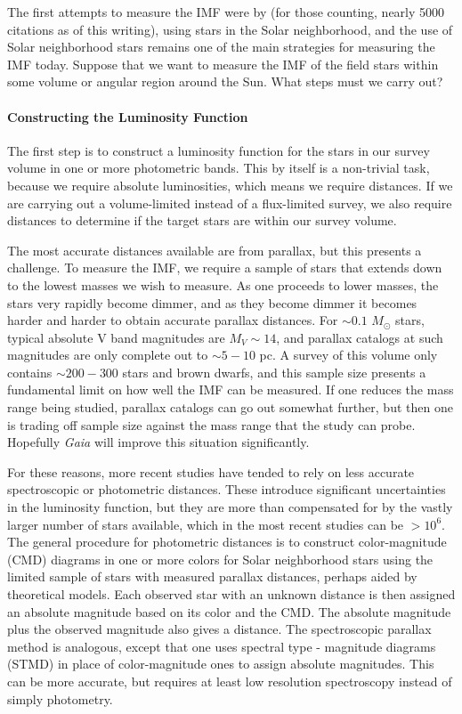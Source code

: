 The first attempts to measure the IMF were by \citet{salpeter55a} (for those counting, nearly 5000 citations as of this writing), using stars in the Solar neighborhood, and the use of Solar neighborhood stars remains one of the main strategies for measuring the IMF today. Suppose that we want to measure the IMF of the field stars within some volume or angular region around the Sun. What steps must we carry out? 

\paragraph{Constructing the Luminosity Function}

The first step is to construct a luminosity function for the stars in our survey volume in one or more photometric bands. This by itself is a non-trivial task, because we require absolute luminosities, which means we require distances. If we are carrying out a volume-limited instead of a flux-limited survey, we also require distances to determine if the target stars are within our survey volume.

The most accurate distances available are from parallax, but this presents a challenge. To measure the IMF, we require a sample of stars that extends down to the lowest masses we wish to measure. As one proceeds to lower masses, the stars very rapidly become dimmer, and as they become dimmer it becomes harder and harder to obtain accurate parallax distances. For $\sim 0.1$ $M_\odot$ stars, typical absolute V band magnitudes are $M_V \sim 14$, and parallax catalogs at such magnitudes are only complete out to $\sim 5-10$ pc. A survey of this volume only contains $\sim 200-300$ stars and brown dwarfs, and this sample size presents a fundamental limit on how well the IMF can be measured. If one reduces the mass range being studied, parallax catalogs can go out somewhat further, but then one is trading off sample size against the mass range that the study can probe. Hopefully \textit{Gaia} will improve this situation significantly.

For these reasons, more recent studies have tended to rely on less accurate spectroscopic or photometric distances. These introduce significant uncertainties in the luminosity function, but they are more than compensated for by the vastly larger number of stars available, which in the most recent studies can be $>10^6$. The general procedure for photometric distances is to construct color-magnitude (CMD) diagrams in one or more colors for Solar neighborhood stars using the limited sample of stars with measured parallax distances, perhaps aided by theoretical models. Each observed star with an unknown distance is then assigned an absolute magnitude based on its color and the CMD. The absolute magnitude plus the observed magnitude also gives a distance. The spectroscopic parallax method is analogous, except that one uses spectral type - magnitude diagrams (STMD) in place of color-magnitude ones to assign absolute magnitudes. This can be more accurate, but requires at least low resolution spectroscopy instead of simply photometry.

